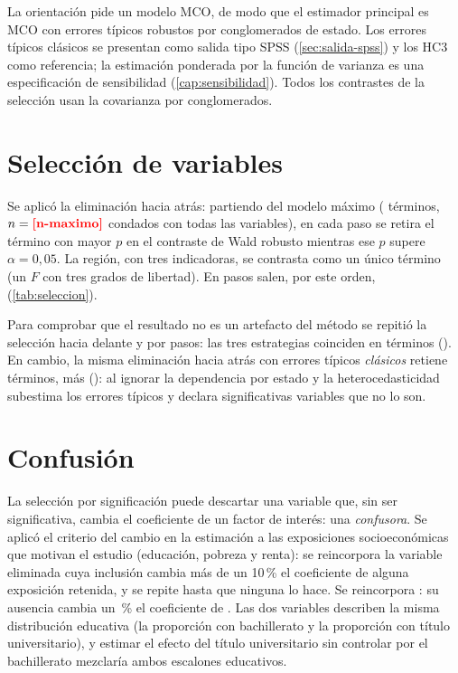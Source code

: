 \begin{idea}[Decisión.]
La orientación pide un modelo MCO, de modo que el estimador principal es MCO con errores típicos
robustos por conglomerados de estado. Los errores típicos clásicos se presentan como salida tipo
SPSS (\cref{sec:salida-spss}) y los HC3 \parencite{mackinnon1985} como referencia; la estimación
ponderada por la función de varianza es una especificación de sensibilidad
(\cref{cap:sensibilidad}). Todos los contrastes de la selección usan la covarianza por
conglomerados.
\end{idea}

\section{Selección de variables}

Se aplicó la eliminación hacia atrás: partiendo del modelo máximo ( términos,
$n=\res{n-maximo}$ condados con todas las variables), en cada paso se retira el término con mayor
$p$ en el contraste de Wald robusto mientras ese $p$ supere $\alpha=0{,}05$. La región, con tres
indicadoras, se contrasta como un único término (un $F$ con tres grados de libertad). En
 pasos salen, por este orden,  (\cref{tab:seleccion}).



Para comprobar que el resultado no es un artefacto del método se repitió la selección hacia
delante y por pasos: las tres estrategias coinciden en  términos
(). En cambio, la misma eliminación hacia atrás con errores típicos
\emph{clásicos} retiene  términos,  más
(): al ignorar la dependencia por estado y la heterocedasticidad subestima los
errores típicos y declara significativas variables que no lo son.

\section{Confusión}

La selección por significación puede descartar una variable que, sin ser significativa, cambia el
coeficiente de un factor de interés: una \emph{confusora}. Se aplicó el criterio del cambio en la
estimación \parencite{maldonado1993} a las exposiciones socioeconómicas que motivan el estudio
(educación, pobreza y renta): se reincorpora la variable eliminada cuya inclusión cambia más de un
10\,\% el coeficiente de alguna exposición retenida, y se repite hasta que ninguna lo hace. Se
reincorpora : su ausencia cambia un \,\% el coeficiente de
. Las dos variables describen la misma distribución educativa (la
proporción con bachillerato y la proporción con título universitario), y estimar el efecto del
título universitario sin controlar por el bachillerato mezclaría ambos escalones educativos.

